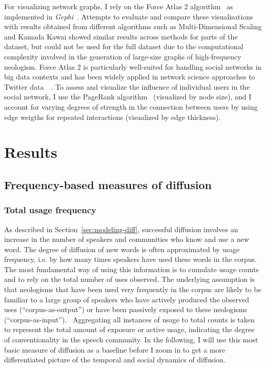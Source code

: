 \documentclass[
  a4paper,
  abstract=on,
  captions=tableabove
  ]{scrartcl}
\begin{document}
  For visualizing network graphs, I rely on the Force Atlas 2 algorithm~\parencite{Jacomy2014ForceAtlas2Continuous} as implemented in \emph{Gephi}~\parencite{Bastian2009GephiOpen}. Attempts to evaluate and compare these visualisations with results obtained from different algorithms such as Multi-Dimensional Scaling and Kamada Kawai showed similar results across methods for parts of the dataset, but could not be used for the full dataset due to the computational complexity involved in the generation of large-size graphs of high-frequency neologism. Force Atlas 2 is particularly well-suited for handling social networks in big data contexts and has been widely applied in network science approaches to Twitter data~ \parencite{Bruns2012HowLong,Gerlitz2013MiningOne,Bliss2012TwitterReciprocal}. To assess and visualize the influence of individual users in the social network, I use the PageRank algorithm~\parencite{Brin1998AnatomyLargeScale} (visualized by node size), and I account for varying degrees of strength in the connection between users by using edge weigths for repeated interactions (visualized by edge thickness).

\section{Results}
  \label{sec:results}

  \subsection{Frequency-based measures of diffusion}
    \label{subsec:freq}

    \subsubsection{Total usage frequency}
      \label{subsec:total-freq}

      As described in Section~\ref{sec:modeling-diff}, successful diffusion involves an increase in the number of speakers and communities who know and use a new word. The degree of diffusion of new words is often approximated by usage frequency, i.e. by how many times speakers have used these words in the corpus. The most fundamental way of using this information is to cumulate usage counts and to rely on the total number of uses observed. The underlying assumption is that neologisms that have been used very frequently in the corpus are likely to be familiar to a large group of speakers who have actively produced the observed uses (\enquote{corpus-as-output}) or have been passively exposed to these neologisms (\enquote{corpus-as-input}).~\parencite{Stefanowitsch2017CorpusbasedPerspective} Aggregating all instances of usage to total counts is taken to represent the total amount of exposure or active usage, indicating the degree of conventionality in the speech community. In the following, I will use this most basic measure of diffusion as a baseline before I zoom in to get a more differentiated picture of the temporal and social dynamics of diffusion.
\end{document}
